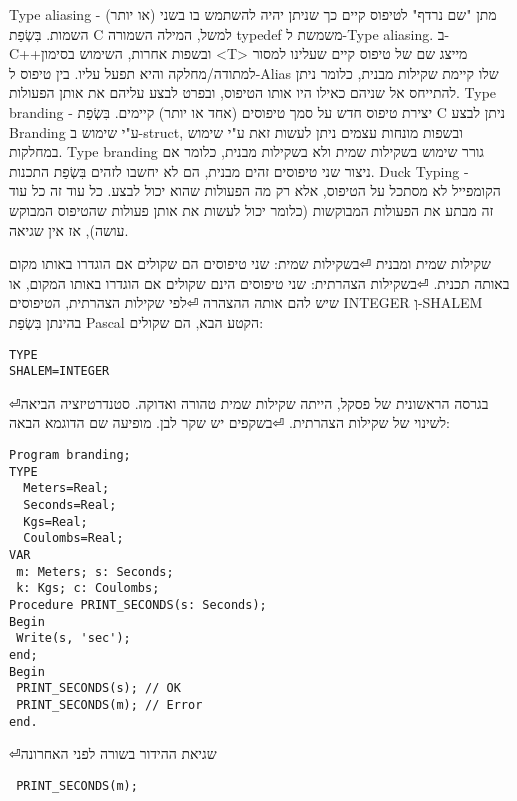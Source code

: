 \begin{טבלא}[!htbp]
      Type aliasing - מתן "שם נרדף" לטיפוס קיים כך שניתן יהיה להשתמש בו בשני (או יותר) השמות. בִּשְׂפַת C למשל, המילה השמורה typedef משמשת ל-Type aliasing. ב-C++ובשפות אחרות, השימוש בסימון <T> מייצג שם של טיפוס קיים שעלינו למסור למתודה/מחלקה והיא תפעל עליו. בין טיפוס ל-Alias שלו קיימת שקילות מבנית, כלומר ניתן להתייחס אל שניהם כאילו היו אותו הטיפוס, ובפרט לבצע עליהם את אותן הפעולות.
      Type branding - יצירת טיפוס חדש על סמך טיפוסים (אחד או יותר) קיימים. בִּשְׂפַת C ניתן לבצע Branding ע"י שימוש ב-struct, ובשפות מונחות עצמים ניתן לעשות זאת ע"י שימוש במחלקות. Type branding גורר שימוש בשקילות שמית ולא בשקילות מבנית, כלומר אם ניצור שני טיפוסים זהים מבנית, הם לא יחשבו לזהים בִּשְׂפַת התכנות.
      Duck Typing - הקומפייל לא מסתכל על הטיפוס, אלא רק מה הפעולות שהוא יכול לבצע. כל עוד זה כל עוד זה מבתע את הפעולות המבוקשות (כלומר יכול לעשות את אותן פעולות שהטיפוס המבוקש עושה), אז אין שגיאה.

      שקילות שמית ומבנית
⏎בשקילות שמית: שני טיפוסים הם שקולים אם הוגדרו באותו מקום באותה תכנית.
⏎בשקילות הצהרתית: שני טיפוסים הינם שקולים אם הוגדרו באותו המקום, או שיש להם אותה ההצהרה
⏎לפי שקילות הצהרתית, הטיפוסים INTEGER וְ-SHALEM בהינתן בִּשְׂפַת Pascal הקטע הבא, הם שקולים:

\begin{verbatim}
TYPE
SHALEM=INTEGER
\end{verbatim}
⏎בגרסה הראשונית של פסקל, הייתה שקילות שמית טהורה ואדוקה. סטנדרטיזציה הביאה לשינוי של שקילות הצהרתית.
⏎בשקפים יש שקר לבן. מופיעה שם הדוגמא הבאה:

\begin{verbatim}
Program branding;
TYPE
  Meters=Real;
  Seconds=Real;
  Kgs=Real;
  Coulombs=Real;
VAR
 m: Meters; s: Seconds;
 k: Kgs; c: Coulombs;
Procedure PRINT_SECONDS(s: Seconds);
Begin
 Write(s, 'sec');
end;
Begin
 PRINT_SECONDS(s); // OK
 PRINT_SECONDS(m); // Error
end.
\end{verbatim}

⏎שגיאת ההידור בשורה לפני האחרונה

\begin{verbatim}
 PRINT_SECONDS(m);
\end{verbatim}


\end{טבלא}
